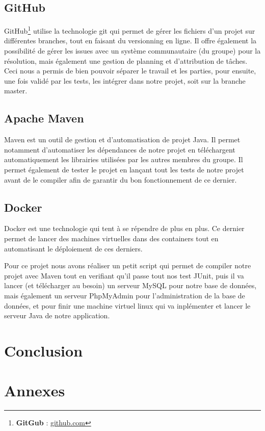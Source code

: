 \documentclass[a4paper,12pt]{article}
\begin{document}
		\subsection{GitHub}
		GitHub\footnote{\textbf{GitGub} : \href{http:/github.com}{github.com}} utilise la technologie git qui permet de gérer les fichiers d'un projet sur différentes branches, tout en faisant du versionning en ligne. Il offre également la possibilité de gérer les issues avec un système communautaire (du groupe) pour la résolution, mais également une gestion de planning et d'attribution de tâches. \\
		Ceci nous a permis de bien pouvoir séparer le travail et les parties, pour ensuite, une fois validé par les tests, les intégrer dans notre projet, soit sur la branche master. 
		
		\subsection{Apache Maven} \label{maven}
		Maven est un outil de gestion et d'automatisation de projet Java. Il permet notamment d'automatiser les dépendances de notre projet en téléchargent automatiquement les librairies utilisées par les autres membres du groupe. Il permet également de tester le projet en lançant tout les tests de notre projet avant de le compiler afin de garantir du bon fonctionnement de ce dernier. 
		
		\subsection{Docker}
		Docker est une technologie qui tent à se répendre de plus en plus. Ce dernier permet de lancer des machines virtuelles dans des containers tout en automatisant le déploiement de ces derniers. 
		
		Pour ce projet nous avons réaliser un petit script qui permet de compiler notre projet avec Maven tout en verifiant qu'il passe tout nos test JUnit, puis il va lancer (et télécharger au besoin) un serveur MySQL pour notre base de données, mais également un serveur PhpMyAdmin pour l'administration de la base de données, et pour finir une machine virtuel linux qui va inplémenter et lancer le serveur Java de notre application. 
	
	\section{Conclusion}
	
	\newpage
	\section{Annexes}

	
	
	
	
\end{document}
